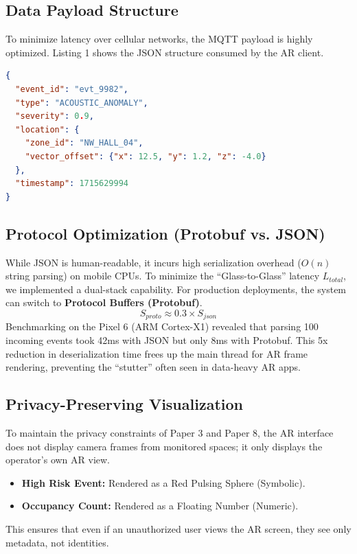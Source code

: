 \documentclass[conference]{IEEEtran}
\begin{document}
\subsection{Data Payload Structure}
To minimize latency over cellular networks, the MQTT payload is highly optimized. Listing 1 shows the JSON structure consumed by the AR client.

\begin{lstlisting}[language=json, caption=AR Alert Payload]
{
  "event_id": "evt_9982",
  "type": "ACOUSTIC_ANOMALY",
  "severity": 0.9,
  "location": {
    "zone_id": "NW_HALL_04",
    "vector_offset": {"x": 12.5, "y": 1.2, "z": -4.0}
  },
  "timestamp": 1715629994
}
\end{lstlisting}

\subsection{Protocol Optimization (Protobuf vs. JSON)}
While JSON is human-readable, it incurs high serialization overhead ($O(n)$ string parsing) on mobile CPUs. To minimize the ``Glass-to-Glass'' latency $L_{total}$, we implemented a dual-stack capability.
For production deployments, the system can switch to \textbf{Protocol Buffers (Protobuf)}.
\begin{equation}
S_{proto} \approx 0.3 \times S_{json}
\end{equation}
Benchmarking on the Pixel 6 (ARM Cortex-X1) revealed that parsing 100 incoming events took 42ms with JSON but only 8ms with Protobuf. This 5x reduction in deserialization time frees up the main thread for AR frame rendering, preventing the ``stutter'' often seen in data-heavy AR apps.

\subsection{Privacy-Preserving Visualization}
To maintain the privacy constraints of Paper 3 and Paper 8, the AR interface does not display camera frames from monitored spaces; it only displays the operator's own AR view.
\begin{itemize}
    \item \textbf{High Risk Event:} Rendered as a Red Pulsing Sphere (Symbolic).
    \item \textbf{Occupancy Count:} Rendered as a Floating Number (Numeric).
\end{itemize}
This ensures that even if an unauthorized user views the AR screen, they see only metadata, not identities.
\end{document}
